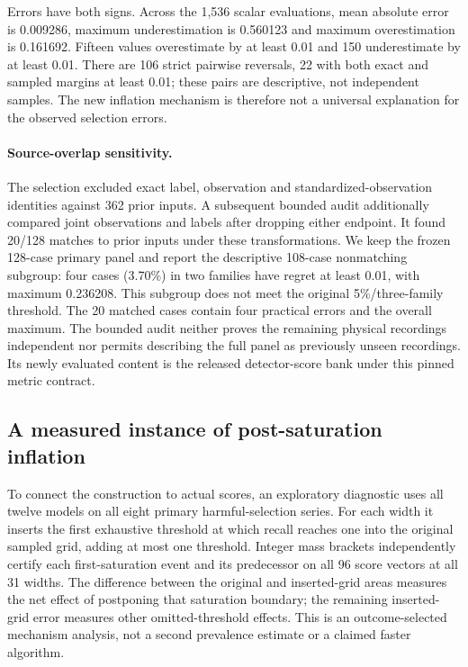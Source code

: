 Errors have both signs. Across the 1,536 scalar evaluations, mean absolute
error is 0.009286, maximum underestimation is 0.560123 and maximum
overestimation is 0.161692. Fifteen values overestimate by at least 0.01
and 150 underestimate by at least 0.01. There are 106 strict pairwise
reversals, 22 with both exact and sampled margins at least 0.01; these
pairs are descriptive, not independent samples. The new inflation mechanism
is therefore not a universal explanation for the observed selection errors.

\paragraph{Source-overlap sensitivity.}
The selection excluded exact label, observation and standardized-observation
identities against 362 prior inputs. A subsequent bounded audit additionally
compared joint observations and labels after dropping either endpoint. It
found 20/128 matches to prior inputs under these transformations. We keep
the frozen 128-case primary panel and report the descriptive 108-case
nonmatching subgroup: four cases (3.70\%) in two families have regret at
least 0.01, with maximum 0.236208. This subgroup does not meet the original
5\%/three-family threshold. The 20 matched cases contain four practical
errors and the overall maximum. The bounded audit neither proves the
remaining physical recordings independent nor permits describing the
full panel as previously unseen recordings. Its newly evaluated content
is the released detector-score bank under this pinned metric contract.

\subsection{A measured instance of post-saturation inflation}
To connect the construction to actual scores, an exploratory diagnostic
uses all twelve models on all eight primary harmful-selection series.
For each width it inserts the first exhaustive threshold at which recall
reaches one into the original sampled grid, adding at most one threshold.
Integer mass brackets independently certify each first-saturation event
and its predecessor on all 96 score vectors at all 31 widths.
The difference between the original and inserted-grid areas measures the
net effect of postponing that saturation boundary; the remaining
inserted-grid error measures other omitted-threshold effects. This is an
outcome-selected mechanism analysis, not a second prevalence estimate or
a claimed faster algorithm.

